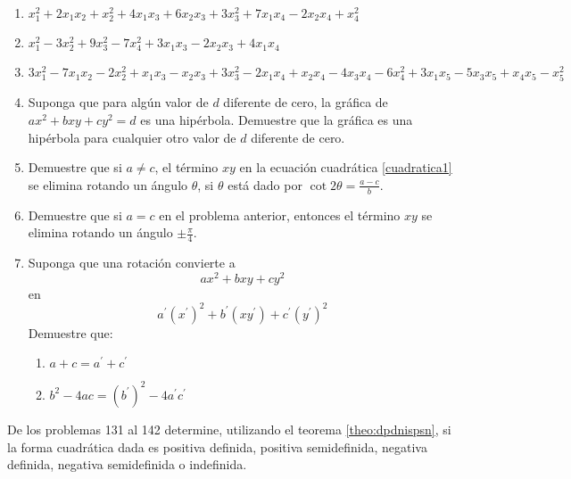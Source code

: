 \begin{enumerate}[resume]
    \item $x_{1}^{2}+2 x_{1} x_{2}+x_{2}^{2}+4 x_{1} x_{3}+6 x_{2} x_{3}+3 x_{3}^{2}+7 x_{1} x_{4}-2 x_{2} x_{4}+x_{4}^{2}$
    \item $x_{1}^{2}-3 x_{2}^{2}+9 x_{3}^{2}-7 x_{4}^{2}+3 x_{1} x_{3}-2 x_{2} x_{3}+4 x_{1} x_{4}$\newpage
    \item $3 x_{1}^{2}-7 x_{1} x_{2}-2 x_{2}^{2}+x_{1} x_{3}-x_{2} x_{3}+3 x_{3}^{2}-2 x_{1} x_{4}+x_{2} x_{4}-4 x_{3} x_{4}-6 x_{4}^{2}+3 x_{1} x_{5}-5 x_{3} x_{5}+x_{4} x_{5}-x_{5}^{2}$
    \item Suponga que para algún valor de $d$ diferente de cero, la gráfica de $a x^{2}+b x y+c y^{2}=d$ es una hipérbola. Demuestre que la gráfica es una hipérbola para cualquier otro valor de $d$ diferente de cero.
    \item Demuestre que si $a \neq c$, el término $x y$ en la ecuación cuadrática \eqref{cuadratica1} se elimina rotando un ángulo $\theta$, si $\theta$ está dado por $\displaystyle\cot 2 \theta=\frac{a-c}{b}$.
    \item Demuestre que si $a=c$ en el problema anterior, entonces el término $x y$ se elimina rotando un ángulo $\displaystyle\pm \frac{\pi}{4}$.
    \item Suponga que una rotación convierte a
    $$a x^{2}+b x y+c y^{2}$$
    en $$a^{\prime}\left(x^{\prime}\right)^{2}+b^{\prime}\left(x y^{\prime}\right)+c^{\prime}\left(y^{\prime}\right)^{2}$$
    Demuestre que:
    \begin{enumerate}
        \item $a+c=a^{\prime}+c^{\prime}$
        \item $b^{2}-4 a c=\left(b^{\prime}\right)^{2}-4 a^{\prime} c^{\prime}$
    \end{enumerate}
\end{enumerate}
De los problemas 131 al 142 determine, utilizando el teorema \ref{theo:dpdnispsn}, si la forma cuadrática dada es positiva definida, positiva semidefinida, negativa definida, negativa semidefinida o indefinida.
\begin{multienumerate}
    \setcounter{multienumi}{130}
\end{multienumerate}
